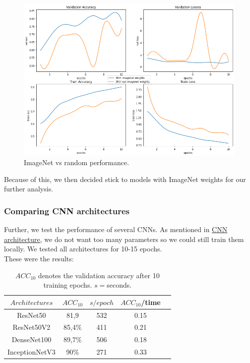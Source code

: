\begin{figure}[ht] 
        \centering \includegraphics[width=1\columnwidth]{figures/comparison_softmax.png}
        \caption{\label{fig:comparison-softmax} ImageNet vs random performance.}
\end{figure}

\noindent Because of this, we then decided stick to models with ImageNet weights for our further analysis.

\subsubsection{Comparing CNN architectures}
Further, we test the performance of several CNNs. As mentioned in \hyperref[subsec:cnn]{CNN architecture}, we do not want too many parameters so we could still train them locally. We tested all architectures for 10-15 epochs. \\

\noindent These were the results:

\begin{table}[ht]
\begin{tabular}{ c c c c c }
  \hline
    \(Architectures\) &  \(ACC_{10}\) & \(s/epoch\) & \(ACC_{10}\)/time \\ \hline \hline
  ResNet50  & 81,9 & 532 & 0.15 \\ \hline
  ResNet50V2  & 85,4\% & 411 & 0.21 \\ \hline
  DenseNet100  & 89,7\% & 506 & 0.18\\ \hline
  InceptionNetV3  & 90\% & 271 & 0.33\\ \hline
\end{tabular}
\caption{ \(ACC_{10}\) denotes the validation accuracy after 10 training epochs. $s=$seconds.}
\end{table}

